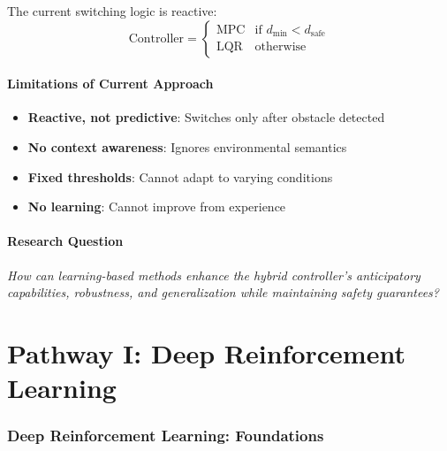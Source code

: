 \documentclass[11pt,a4paper]{article}
\begin{document}
The current switching logic is reactive:
\begin{equation}
  \text{Controller} = 
  \begin{cases}
    \text{MPC} & \text{if } d_{\min} < d_{\text{safe}} \\
    \text{LQR} & \text{otherwise}
  \end{cases}
\end{equation}

\subsection{Limitations of Current Approach}

\begin{warningbox}
\begin{itemize}
  \item \textbf{Reactive, not predictive}: Switches only after obstacle detected
  \item \textbf{No context awareness}: Ignores environmental semantics
  \item \textbf{Fixed thresholds}: Cannot adapt to varying conditions
  \item \textbf{No learning}: Cannot improve from experience
\end{itemize}
\end{warningbox}

\subsection{Research Question}

\textit{How can learning-based methods enhance the hybrid controller's anticipatory capabilities, robustness, and generalization while maintaining safety guarantees?}

\newpage
\part*{\textcolor{drlcolor}{Pathway I: Deep Reinforcement Learning}}

\section{Deep Reinforcement Learning: Foundations}
\end{document}
